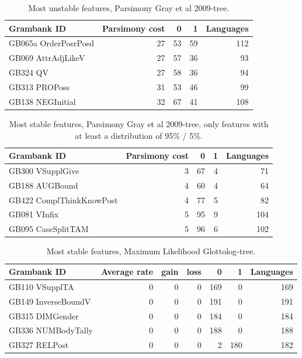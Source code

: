 \documentclass[draft,10pt]{article} %
\begin{document}
\begin{table}[H]
\centering
\begin{tabular}{lrrrr}
  \hline
Grambank ID & Parsimony cost & 0 & 1 & Languages \\ 
  \hline
GB065a OrderPosrPosd & 27 & 53 & 59 & 112 \\ 
  GB069 AttrAdjLikeV & 27 & 57 & 36 & 93 \\ 
  GB324 QV & 27 & 58 & 36 & 94 \\ 
  GB313 PROPoss & 31 & 53 & 46 & 99 \\ 
  GB138 NEGInitial & 32 & 67 & 41 & 108 \\ 
   \hline
\end{tabular}
\caption{Most unstable features, Parsimony Gray et al 2009-tree.} 
\label{unstable_parsimony_gray}
\end{table}

\begin{table}[H]
\centering
\begin{tabular}{lrrrr}
  \hline
Grambank ID & Parsimony cost & 0 & 1 & Languages \\ 
  \hline
GB300 VSupplGive & 3 & 67 & 4 & 71 \\ 
  GB188 AUGBound & 4 & 60 & 4 & 64 \\ 
  GB422 ComplThinkKnowPost & 4 & 77 & 5 & 82 \\ 
  GB081 VInfix & 5 & 95 & 9 & 104 \\ 
  GB095 CaseSplitTAM & 5 & 96 & 6 & 102 \\ 
   \hline
\end{tabular}
\caption{Most stable features, Parsimony Gray et al 2009-tree, only features with at least a distribution of 95\% / 5\%.} 
\label{stable_parsimony_gray_5_precent}
\end{table}

\begin{table}[H]
\centering
\begin{tabular}{lrrrrrr}
  \hline
Grambank ID & Average rate & gain & loss & 0 & 1 & Languages \\ 
  \hline
GB110 VSupplTA & 0 & 0 & 0 & 169 & 0 & 169 \\ 
  GB149 InverseBoundV & 0 & 0 & 0 & 191 & 0 & 191 \\ 
  GB315 DIMGender & 0 & 0 & 0 & 184 & 0 & 184 \\ 
  GB336 NUMBodyTally & 0 & 0 & 0 & 188 & 0 & 188 \\ 
  GB327 RELPost & 0 & 0 & 0 & 2 & 180 & 182 \\ 
   \hline
\end{tabular}
\caption{Most stable features, Maximum Likelihood Glottolog-tree.} 
\label{stable_ML_glottolog}
\end{table}
\end{document}
